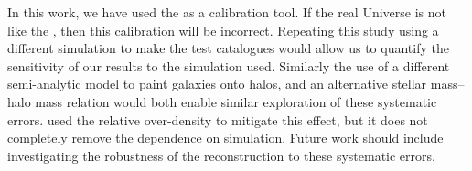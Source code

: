\documentclass[useAMS,usenatbib,a4paper]{mn2e}
\begin{document}

In this work, we have used  the \MS as a calibration tool. If the real
Universe is not like the \MS, then this calibration will be incorrect.
Repeating this  study using a different simulation to make the test catalogues
would allow us to quantify the sensitivity of our results to the simulation
used. Similarly the use of a different semi-analytic model to paint galaxies
onto halos, and an alternative stellar mass--halo mass relation would both
enable similar exploration of these systematic errors. \citet{SuyuEtal2010}
used the relative over-density to mitigate this effect, but it does not
completely remove the dependence on simulation. Future work should include
investigating the robustness of the reconstruction to these systematic errors.


\end{document}
